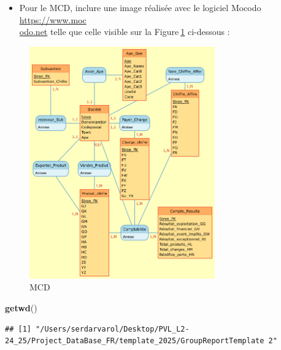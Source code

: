 \documentclass[mstat,12pt]{unswthesis}
\newenvironment{Shaded}{\begin{snugshade}}{\end{snugshade}}
\newcommand{\FunctionTok}[1]{\textcolor[rgb]{0.13,0.29,0.53}{\textbf{#1}}}
\newcommand{\NormalTok}[1]{#1}
\begin{document}
\begin{itemize}
\tightlist
\item
  Pour le MCD, inclure une image réalisée avec le logiciel Mocodo
  \href{https://www.mocodo.net/?mcd=eNqNksFu2zAMhu96Ch0dQAOW7Zab67ZK2zTL4ixtcjEUh14FOJKhyFm3N_J9b-AX62_HaOMEAwb4Ay1SIvlLjMvNQRmvrRnxWDsywe3DQPD43R296MwRCw9Wu7AgMRzy2Ka6rnxdieGUwyfJsKMZNUsBpmrX2kj5z50ddvZLZ7-Kid5QniNNZLfEMoXyTTWUC7OM3EWpLpggiq2j0BgixhyldLClQ8uC945wnPkQ0u1_D49auYJfk7E7fdwjeNNKYfde5WJhf8GBZtlM_SYXvSj380w_b7tq_Ena3lNX5KzT05u9DcE1kOAePIIp-AZm4DuYM3bzWljnyc2c3ZbaX9btAv3CSzJbR01Il_97pi-g12sMFuAHWIIn8AxWYC24_PNp9cxGDN9Z5pMsEiLlA5gAiJUQKyFWQuwYlzG-AhHApaxvBF8h-WrNIrsrvNroXHtqH79Z05z2Ze5VTxm_nA1xoVX866VO0_bEz-uqdfqEXovcavxhQgIpe7FMG2VSTS6Qy4H48Ktm6hK9K-q_fh_Ip7OEKRVNNkN5ML5DbGExcUlxbHkfjCcDcXSlbc_wPGLXVV2Zusp0SklBGI5gPB2wN-SeTJ4=}{https://www.moc\\odo.net}
  telle que celle visible sur la Figure\(~\)\ref{MCD} ci-dessous :
\end{itemize}

\begin{figure}
\centering
\includegraphics[width=8cm,height=10cm]{MCD.png}
\caption{MCD}\label{MCD}
\end{figure}

\begin{Shaded}
\begin{Highlighting}[]
\FunctionTok{getwd}\NormalTok{()}
\end{Highlighting}
\end{Shaded}

\begin{verbatim}
## [1] "/Users/serdarvarol/Desktop/PVL_L2-24_25/Project_DataBase_FR/template_2025/GroupReportTemplate 2"
\end{verbatim}
\end{document}
